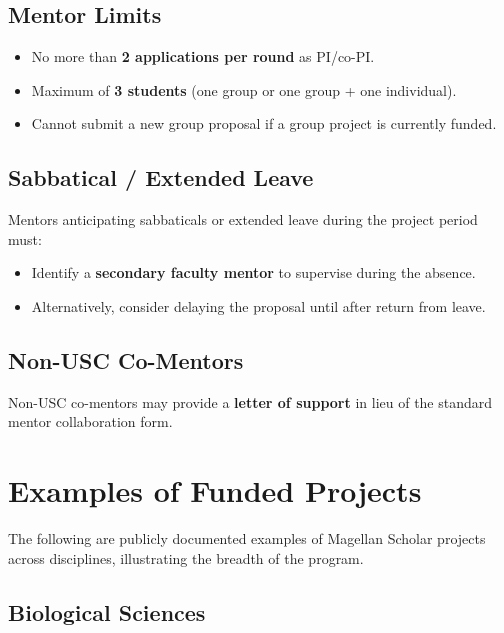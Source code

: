 \documentclass[11pt, letterpaper]{article}
\begin{document}
\subsection{Mentor Limits}

\begin{itemize}[nosep]
    \item No more than \textbf{2 applications per round} as PI/co-PI.
    \item Maximum of \textbf{3 students} (one group or one group + one individual).
    \item Cannot submit a new group proposal if a group project is currently funded.
\end{itemize}

\subsection{Sabbatical / Extended Leave}

Mentors anticipating sabbaticals or extended leave during the project period must:
\begin{itemize}[nosep]
    \item Identify a \textbf{secondary faculty mentor} to supervise during the absence.
    \item Alternatively, consider delaying the proposal until after return from leave.
\end{itemize}

\subsection{Non-USC Co-Mentors}

Non-USC co-mentors may provide a \textbf{letter of support} in lieu of the standard mentor collaboration form.

\section{Examples of Funded Projects}

The following are publicly documented examples of Magellan Scholar projects across disciplines, illustrating the breadth of the program.

\subsection{Biological Sciences}
\end{document}
